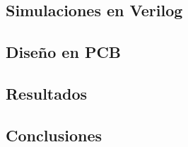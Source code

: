 \subsection{Simulaciones en Verilog}



\subsection{Diseño en PCB}



\subsection{Resultados}



\subsection{Conclusiones}
